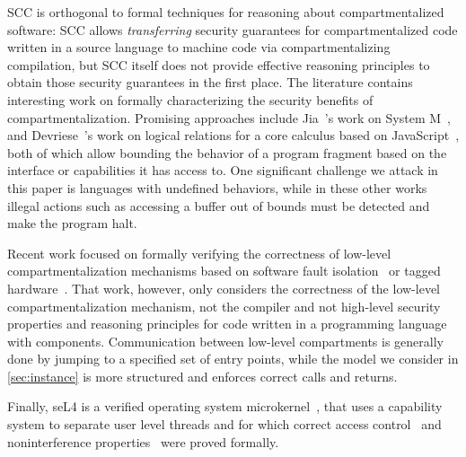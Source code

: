 \documentclass[10pt, conference, compsocconf, letterpaper, times]{IEEEtran}
\begin{document}




SCC is orthogonal to formal techniques for reasoning about
compartmentalized software: SCC allows {\em transferring} security
guarantees for compartmentalized code written in a source language
to machine code via compartmentalizing compilation, but SCC itself
does not provide effective reasoning principles to obtain those
security guarantees in the first place.
The literature contains interesting work on formally characterizing
the security benefits of compartmentalization.
Promising approaches include Jia~\ETAL's work on System
M~\cite{JiaS0D15}, and Devriese~\ETAL's work on logical relations for
a core calculus based on JavaScript~\cite{DevriesePB16}, both of which
allow bounding the behavior of a program fragment based on the
interface or capabilities it has access to.
One significant challenge we attack in this paper is languages with
undefined behaviors, while in these other works illegal actions such
as accessing a buffer out of bounds must be detected and make the program
halt.


Recent work focused on formally verifying the correctness of
low-level compartmentalization
mechanisms based on software fault isolation~\cite{ZhaoLSR11,
  MorrisettTTTG12, KrollSA14} or tagged hardware~\cite{micropolicies2015}.
That work, however, only considers the correctness of the low-level
compartmentalization mechanism, not the compiler and not high-level
security properties and reasoning principles for code written in
a programming language with components.
\ifsooner
{}
\fi
Communication between low-level compartments is generally done by jumping to a
specified set of entry points, while the model we consider in
\autoref{sec:instance} is more structured and enforces correct calls
and returns.

Finally, seL4 is a verified operating system
microkernel~\cite{Klein09sel4:formal}, that uses a capability system
to separate user level threads and for which correct access
control~\cite{SewellWGMAK11} and noninterference
properties~\cite{seL4:Oakland2013} were proved formally.
\end{document}
